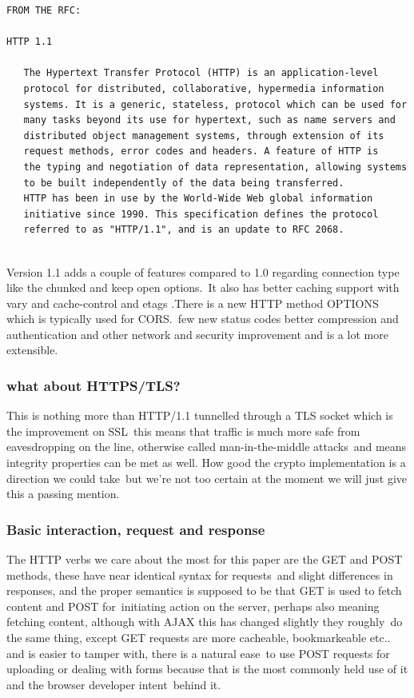 \documentclass[a4paper,12pt]{paper}
\begin{document}
\begin{verbatim}
FROM THE RFC:

HTTP 1.1

   The Hypertext Transfer Protocol (HTTP) is an application-level
   protocol for distributed, collaborative, hypermedia information
   systems. It is a generic, stateless, protocol which can be used for
   many tasks beyond its use for hypertext, such as name servers and
   distributed object management systems, through extension of its
   request methods, error codes and headers. A feature of HTTP is
   the typing and negotiation of data representation, allowing systems
   to be built independently of the data being transferred.
   HTTP has been in use by the World-Wide Web global information
   initiative since 1990. This specification defines the protocol
   referred to as "HTTP/1.1", and is an update to RFC 2068.
  
\end{verbatim}
 
Version 1.1 adds a couple of features compared to 1.0 regarding connection type like the chunked and keep open options.\
It also has better caching support with vary and cache-control and etags .There is a new HTTP method OPTIONS which is typically used for CORS.\
few new status codes better compression and authentication and other network and security improvement and is a lot more extensible.\\
  
\subsubsection{what about HTTPS/TLS?}

This is nothing more than HTTP/1.1 tunnelled through a TLS socket which is the improvement on SSL\
this means that traffic is much more safe from eavesdropping on the line, otherwise called man-in-the-middle attacks\
and means integrity properties can be met as well. How good the crypto implementation is a direction we could take\
but we're not too certain at the moment we will just give this a passing mention.\

\subsubsection{Basic interaction, request and response}

The HTTP verbs we care about the most for this paper are the GET and POST methods, these have near identical syntax for requests\
and slight differences in responses, and the proper semantics is supposed to be that GET is used to fetch content and POST for\
initiating action on the server, perhaps also meaning fetching content, although with AJAX this has changed slightly they roughly\
do the same thing, except GET requests are more cacheable, bookmarkeable etc.. and is easier to tamper with, there is a natural ease\
to use POST requests for uploading or dealing with forms because that is the most commonly held use of it and the browser developer intent\
behind it.\
\end{document}
